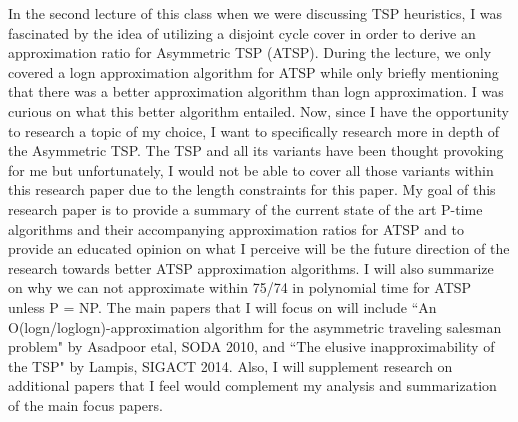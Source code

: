 \documentclass[oneside]{homework} %
\begin{document}
\maketitle
\skipevenpage

In the second lecture of this class when we were discussing TSP heuristics, I was fascinated by the idea of utilizing a disjoint cycle cover in order to derive an approximation ratio for Asymmetric TSP (ATSP). During the lecture, we only covered a logn approximation algorithm for ATSP while only briefly mentioning that there was a better approximation algorithm than logn approximation. I was curious on what this better algorithm entailed. Now, since I have the opportunity to research a topic of my choice, I want to specifically research more in depth of the Asymmetric TSP. The TSP and all its variants have been thought provoking for me but unfortunately, I would not be able to cover all those variants within this research paper due to the length constraints for this paper. My goal of this research paper is to provide a summary of the current state of the art P-time algorithms and their accompanying approximation ratios for ATSP and to provide an educated opinion on what I perceive will be the future direction of the research towards better ATSP approximation algorithms. I will also summarize on why we can not approximate within 75/74 in polynomial time for ATSP unless P = NP. The main papers that I will focus on will include ``An O(logn/loglogn)-approximation algorithm for the asymmetric traveling salesman problem" by Asadpoor etal, SODA 2010, and ``The elusive inapproximability of the TSP" by Lampis, SIGACT 2014. Also, I will supplement research on additional papers that I feel would complement my analysis and summarization of the main focus papers.
\end{document}
